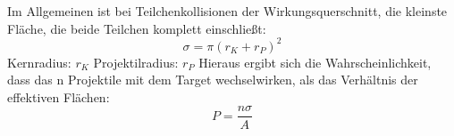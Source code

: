\documentclass[Ex4_Zusammenfassung.tex]{subfiles}
\begin{document}
Im Allgemeinen ist bei Teilchenkollisionen der Wirkungsquerschnitt, die kleinste Fläche, die beide Teilchen komplett einschließt: 
\begin{equation}
\sigma = \pi (r_{K} + r_{P})^2 
\end{equation}
Kernradius: $ r_K $ \qquad Projektilradius: $ r_P $ \newline
Hieraus ergibt sich die Wahrscheinlichkeit, dass das n Projektile mit dem Target wechselwirken, als das Verhältnis der effektiven Flächen:
\begin{equation}
P = \frac{n \sigma}{A}
\end{equation}
\end{document}

